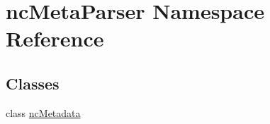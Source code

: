 \hypertarget{namespacenc_meta_parser}{}\section{nc\+Meta\+Parser Namespace Reference}
\label{namespacenc_meta_parser}
\subsection*{Classes}
\begin{DoxyCompactItemize}
\item 
class \mbox{\hyperlink{classnc_meta_parser_1_1nc_metadata}{nc\+Metadata}}
\end{DoxyCompactItemize}
